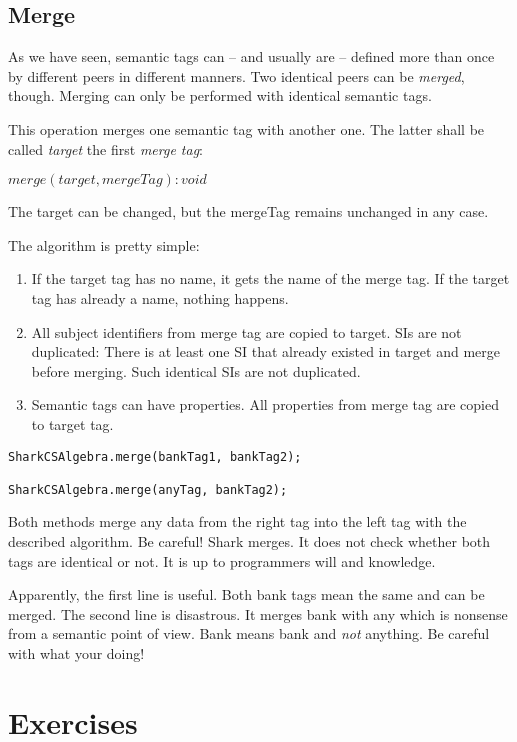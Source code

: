 \subsection{Merge}
As we have seen, semantic tags can -- and usually are -- defined more than once by different peers in different manners. Two identical peers can be {\it merged}, though. Merging can only be performed with identical semantic tags.

This operation merges one semantic tag with another one. The latter shall be called {\it target} the first {\it merge tag}:  

$merge(target, mergeTag): void$

The target can be changed, but the mergeTag remains unchanged in any case.

The algorithm is pretty simple:

\begin{enumerate}
\item 
If the target tag has no name, it gets the name of the merge tag. If the target tag has already a name, nothing happens.

\item
All subject identifiers from merge tag are copied to target. SIs are not duplicated: There is at least one SI that already existed in target and merge before merging. Such identical SIs are not duplicated.

\item
Semantic tags can have properties. All properties from merge tag are copied to target tag.
\end{enumerate}

\begin{verbatim}
SharkCSAlgebra.merge(bankTag1, bankTag2);

SharkCSAlgebra.merge(anyTag, bankTag2);
\end{verbatim}

Both methods merge any data from the right tag into the left tag with the described algorithm. Be careful! Shark merges. It does not check whether both tags are identical or not. It is up to programmers will and knowledge. 

Apparently, the first line is useful. Both bank tags mean the same and can be merged. The second line is disastrous. It merges bank with any which is nonsense from a semantic point of view. Bank means bank and {\it not} anything. Be careful with what your doing!

\section{Exercises}

